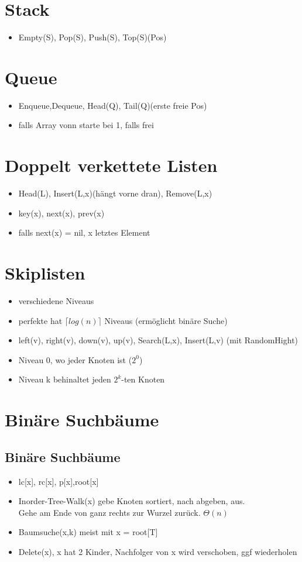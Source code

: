\documentclass{article}
\begin{document}
\section{Stack}
\begin{itemize}
\item Empty(S), Pop(S), Push(S), Top(S)(Pos)
\end{itemize}

\section{Queue}
\begin{itemize}
\item Enqueue,Dequeue, Head(Q), Tail(Q)(erste freie Pos)
\item falls Array vonn starte bei 1, falls frei
\end{itemize}

\section{Doppelt verkettete Listen}
\begin{itemize}
\item Head(L), Insert(L,x)(h{\"a}ngt vorne dran), Remove(L,x)
\item key(x), next(x), prev(x)
\item falls next(x) = nil, x letztes Element
\end{itemize}

\section{Skiplisten}
\begin{itemize}
\item verschiedene Niveaus 
\item perfekte hat $ \lceil  log(n)\rceil$ Niveaus (erm{\"o}glicht bin{\"a}re Suche)
\item left(v), right(v), down(v), up(v), Search(L,x), Insert(L,v) (mit RandomHight)
\item Niveau 0, wo jeder Knoten ist ($2^0$)
\item Niveau k behinaltet jeden $2^k$-ten Knoten
\end{itemize}

\section{Bin{\"a}re Suchb{\"a}ume}
\subsection{Bin{\"a}re Suchb{\"a}ume}
\begin{itemize}
\item lc[x], rc[x], p[x],root[x]
\item Inorder-Tree-Walk(x) gebe Knoten sortiert, nach abgeben, aus. \\ Gehe am Ende von ganz rechts zur Wurzel zur{\"u}ck. $\Theta(n)$
\item Baumsuche(x,k) meist mit x = root[T]
\item Delete(x), x hat 2 Kinder, Nachfolger von x wird verschoben, ggf wiederholen
\end{itemize}
\end{document}
